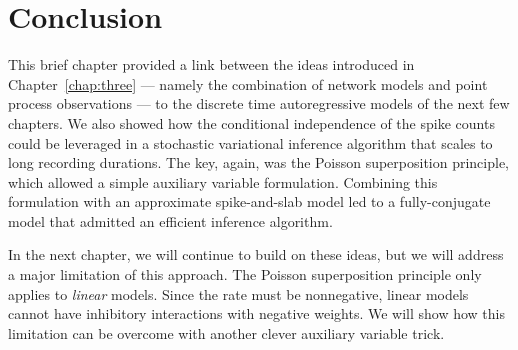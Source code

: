 \begin{table}
  \centering
  \caption[Comparison of inference algorithms on the Chalearn connectomics challenge]{Comparison of inference algorithms on link prediction for five networks from the Chalearn connectomics challenge. Performance is measured by area under the ROC curve and area under the precision recall curve (PRC). In four of the five networks a Hawkes process model provides the best results.}
  \label{tab:chalearn}
\end{table}

\section{Conclusion}

This brief chapter provided a link between the ideas introduced
in Chapter~\ref{chap:three} --- namely the combination of network
models and point process observations --- to the discrete time
autoregressive models of the next few chapters. We also showed
how the conditional independence of the spike counts could be leveraged
in a stochastic variational inference algorithm that scales to
long recording durations. The key, again, was the Poisson superposition
principle, which allowed a simple auxiliary variable formulation.
Combining this formulation with an approximate spike-and-slab
model led to a fully-conjugate model that admitted an efficient
inference algorithm.

In the next chapter, we will continue to build on these ideas, but we
will address a major limitation of this approach. The Poisson
superposition principle only applies to \emph{linear} models. Since
the rate must be nonnegative, linear models cannot have inhibitory
interactions with negative weights. We will show how this limitation
can be overcome with another clever auxiliary variable trick.

